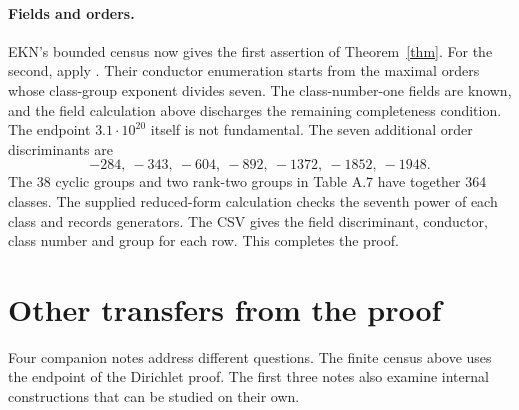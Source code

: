 \documentclass[11pt]{article}
\begin{document}
\paragraph{Fields and orders.}
EKN's bounded census now gives the first assertion of Theorem~\ref{thm}.
For the second, apply \cite[Theorem 1.3(6), Section 6]{ARSX}.
Their conductor enumeration starts from the maximal orders whose class-group
exponent divides seven. The class-number-one fields are known, and the
field calculation above discharges the remaining completeness condition.
The endpoint $3.1\cdot10^{20}$ itself is not fundamental. The seven
additional order discriminants are
\[
 -284,\ -343,\ -604,\ -892,\ -1372,\ -1852,\ -1948.
\]
The 38 cyclic groups and two rank-two groups in Table A.7 have together
364 classes. The supplied reduced-form calculation checks the seventh power
of each class and records generators. The CSV gives the field discriminant,
conductor, class number and group for each row. This completes the proof.

\newpage
\section{Other transfers from the proof}
Four companion notes address different questions. The finite census above
uses the endpoint of the Dirichlet proof. The first three notes also examine
internal constructions that can be studied on their own.
\end{document}
